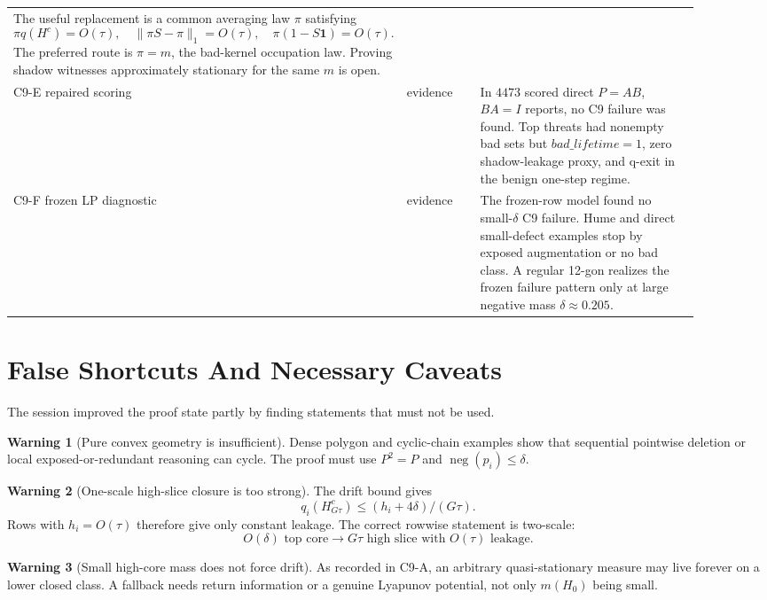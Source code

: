 \documentclass[11pt]{article}
\newcommand{\one}{\mathbf{1}}
\newcommand{\negm}{\operatorname{neg}}
\newcommand{\status}[1]{\textsf{#1}}
\newcommand{\evidence}{\status{evidence}}
\theoremstyle{definition}
\newtheorem{warning}{Warning}
\begin{document}
\begin{longtable}{p{0.18\linewidth}p{0.14\linewidth}p{0.58\linewidth}}
The useful replacement is a common averaging law \(\pi\) satisfying
\[
  \pi q(H^c)=O(\tau),\quad \|\pi S-\pi\|_1=O(\tau),\quad
  \pi(1-S\one)=O(\tau).
\]
The preferred route is \(\pi=m\), the bad-kernel occupation law.  Proving
shadow witnesses approximately stationary for the same \(m\) is open.\\
\addlinespace
C9-E repaired scoring &
\evidence{} &
In \(4473\) scored direct \(P=AB\), \(BA=I\) reports, no C9 failure was
found.  Top threats had nonempty bad sets but \(bad\_lifetime=1\), zero
shadow-leakage proxy, and q-exit in the benign one-step regime.\\
\addlinespace
C9-F frozen LP diagnostic &
\evidence{} &
The frozen-row model found no small-\(\delta\) C9 failure.  Hume and direct
small-defect examples stop by exposed augmentation or no bad class.  A regular
12-gon realizes the frozen failure pattern only at large negative mass
\(\delta\approx0.205\).\\
\bottomrule
\end{longtable}

\section{False Shortcuts And Necessary Caveats}

The session improved the proof state partly by finding statements that must
not be used.

\begin{warning}[Pure convex geometry is insufficient]
Dense polygon and cyclic-chain examples show that sequential pointwise
deletion or local exposed-or-redundant reasoning can cycle.  The proof must
use \(P^2=P\) and \(\negm(p_i)\leq\delta\).
\end{warning}

\begin{warning}[One-scale high-slice closure is too strong]
The drift bound gives
\[
  q_i(H_{G\tau}^c)\leq (h_i+4\delta)/(G\tau).
\]
Rows with \(h_i=O(\tau)\) therefore give only constant leakage.  The correct
rowwise statement is two-scale:
\[
  O(\delta)\text{ top core}\longrightarrow G\tau\text{ high slice with }
  O(\tau)\text{ leakage}.
\]
\end{warning}

\begin{warning}[Small high-core mass does not force drift]
As recorded in C9-A, an arbitrary quasi-stationary measure may live forever
on a lower closed class.  A fallback needs return information or a genuine
Lyapunov potential, not only \(m(H_0)\) being small.
\end{warning}
\end{document}
